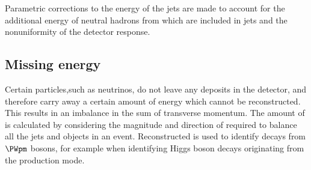 Parametric corrections to the energy of the jets are made to account for the additional energy of \PF neutral hadrons from \PU which are included in jets and the nonuniformity of the detector response.

\subsection{Missing energy}

Certain particles,such as neutrinos, do not leave any deposits in the detector, and therefore carry away a certain amount of energy which cannot be reconstructed. This results in an imbalance in the sum of transverse momentum. The amount of \MET is calculated by considering the magnitude and direction of \pT required to balance all the jets and \PF objects in an event. Reconstructed \MET is used to identify decays from $\PWpm$ bosons, for example when identifying Higgs boson decays originating from the \WH production mode. 


